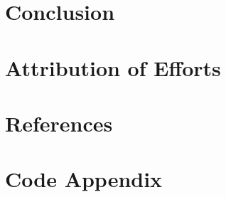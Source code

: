 \documentclass[12pt]{article}
\begin{document}
\section{Conclusion} 
\paragraph{}

\section{Attribution of Efforts} 
\paragraph{}

\section{References} 
\paragraph{}

\section{Code Appendix} 
\paragraph{}
\end{document}
